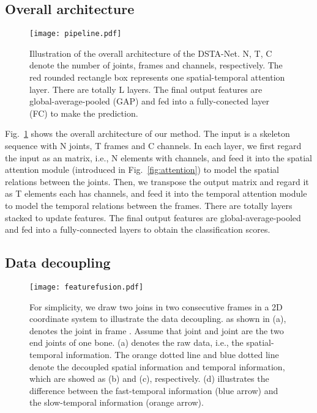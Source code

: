 \documentclass[runningheads]{llncs}
\begin{document}
\subsection{Overall architecture}
\label{sec:architecture}

\begin{figure}[tp]
    \centering
    \texttt{[image: pipeline.pdf]}
    \caption{Illustration of the overall architecture of the DSTA-Net. 
    N, T, C denote the number of joints, frames and channels, respectively. 
The red rounded rectangle box represents one spatial-temporal attention layer. There are totally L layers. The final output features are global-average-pooled (GAP) and fed into a fully-conected layer (FC) to make the prediction.}
    \label{fig:pipeline}
\end{figure}{}

Fig.~\ref{fig:pipeline} shows the overall architecture of our method. 
The input is a skeleton sequence with N joints, T frames and C channels. 
In each layer, we first regard the input as an  matrix, i.e., N elements with  channels, and feed it into the spatial attention module (introduced in Fig.~\ref{fig:attention}) to model the spatial relations between the joints. 
Then, we transpose the output matrix and regard it as T elements each has  channels, and feed it into the temporal attention module to model the temporal relations between the frames. 
There are totally  layers stacked to update features. 
The final output features are global-average-pooled and fed into a fully-connected layers to obtain the classification scores. 

\subsection{Data decoupling}
\label{sec:decouple}
\begin{figure}[tb]
    \centering
    \texttt{[image: featurefusion.pdf]}
    \caption{
For simplicity, we draw two joins in two consecutive frames in a 2D coordinate system to illustrate the data decoupling. 
as shown in (a),  denotes the joint  in frame . Assume that joint  and joint  are the two end joints of one bone. (a) denotes the raw data, i.e., the spatial-temporal information. The orange dotted line and blue dotted line denote the decoupled spatial information and temporal information, which are showed as (b) and (c), respectively. 
    (d) illustrates the difference between the fast-temporal information (blue arrow) and the slow-temporal information (orange arrow). 
    }
    \label{fig:featurefusion}
\end{figure}{}
\end{document}

